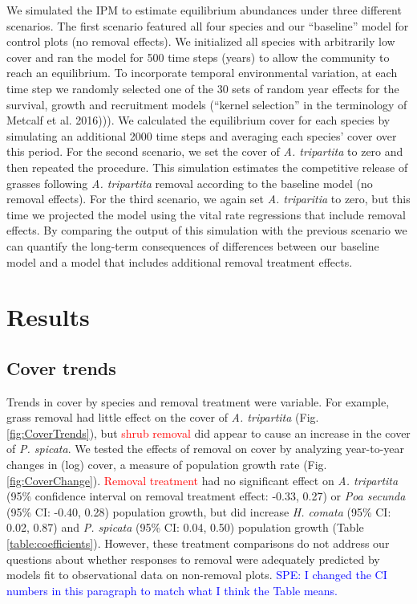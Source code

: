 \documentclass[11pt]{article}
\newcommand{\new}{\textcolor{red}}
\newcommand{\comment}{\textcolor{blue}}
\begin{document}
\begin{doublespacing}
We simulated the IPM to estimate equilibrium abundances under three different scenarios. The first scenario featured all four species and our ``baseline'' model for control plots (no removal effects). We initialized all species with arbitrarily low cover and ran the model for 500 time steps (years) to allow the community to reach an equilibrium. To incorporate temporal environmental variation, at each time step we randomly selected one of the 30 sets of random year effects for the survival, growth and recruitment models (``kernel selection'' in the terminology of Metcalf et al. 2016))). We calculated the equilibrium cover for each species by simulating an additional 2000 time steps and averaging each species' cover over this period. For the second scenario, we set the cover of \textit{A. tripartita} to zero and then repeated the procedure. This simulation estimates the competitive release of grasses following \textit{A. tripartita} removal according to the baseline model (no removal effects). For the third scenario, we again set  \textit{A. triparitia} to zero, but this time we projected the model using the vital rate regressions that include removal effects. By comparing the output of this simulation with the previous scenario we can quantify the long-term consequences of differences between our baseline model and a model that includes additional removal treatment effects.  

\section*{Results}

\subsection*{Cover trends}

Trends in cover by species and removal treatment were variable. For example, grass removal had little effect on the cover of \textit{A. tripartita} 
(Fig. \ref{fig:CoverTrends}), but \new{shrub removal} did appear to cause an increase in the cover of \textit{P. spicata}. We tested the effects of removal on cover by analyzing year-to-year changes in (log) cover, a measure of population growth rate (Fig. \ref{fig:CoverChange}). \new{Removal treatment} had no significant effect on 
\textit{A. tripartita} (95\% confidence interval on removal treatment effect: -0.33, 0.27) or 
\textit{Poa secunda} (95\% CI: -0.40, 0.28) population growth, but did increase 
\textit{H. comata} (95\% CI: 0.02, 0.87) and
 \textit{P. spicata} (95\% CI: 0.04, 0.50) population growth 
(Table \ref{table:coefficients}). However, these treatment comparisons do not address our questions about whether responses to removal were 
adequately predicted by models fit to observational data on non-removal plots. 
\comment{SPE: I changed the CI numbers in this paragraph to match what I think the Table means.} 


\end{doublespacing}
\end{document}
